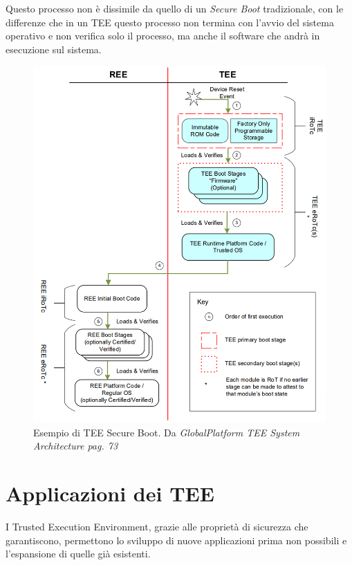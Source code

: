 \documentclass[12pt,italian]{report}
\begin{document}
 	\bigbreak
 	
 	Questo processo non è dissimile da quello di un \textit{Secure Boot} tradizionale, con le differenze che in un TEE questo processo non termina con l'avvio del sistema operativo e non verifica solo il processo, ma anche il software che andrà in esecuzione sul sistema.
 	
 	\begin{figure}
 		\centering
 		\includegraphics[width=1\textwidth]{immagini/TEE_Secure_Boot}
 		\caption{
 			Esempio di TEE Secure Boot. 
 			Da \textit{GlobalPlatform TEE System Architecture pag. 73}
 			\cite{gp2020systemarchitecture}
 		}
 		\label{fig:tee-secure-boot}
 	\end{figure}
 	
 	\newpage
 	
 	\section{Applicazioni dei TEE}
 	\label{sec:applicazioni}
	I Trusted Execution Environment, grazie alle proprietà di sicurezza che garantiscono, permettono lo sviluppo di nuove applicazioni prima non possibili e l'espansione di quelle già esistenti.
	
\end{document}
